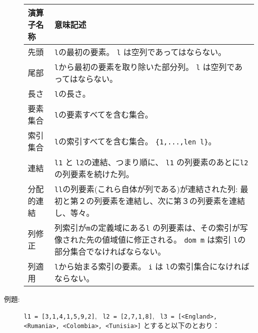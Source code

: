 \documentclass[\pformat,12pt]{jarticle}
\newenvironment{TypeSemantics}{\begin{longtable}[r]{|p{3.5cm}|p{9cm}|}\hline%
  演算子名称 & 意味記述 \\ \hline\hline \endhead}%
  {\hline\end{longtable}}
\begin{document}
\begin{description}
\begin{TypeSemantics}
先頭 & {\tt l}の最初の要素。 {\tt l} は空列であってはならない。 \\ \hline
尾部 &  {\tt l}から最初の要素を取り除いた部分列。 {\tt l} は空列であってはならない。\\ \hline
長さ &  {\tt l}の長さ。 \\ \hline
要素集合 & {\tt l}の要素すべてを含む集合。 \\ \hline
索引集合 &  {\tt l}の索引すべてを含む集合。 \mbox{\tt \{1,...,len l\}}。 \\ \hline
連結 & {\tt l1} と {\tt l2}の連結、つまり順に、 {\tt l1} の列要素のあとに{\tt l2}の列要素を続けた列。 \\ \hline
分配的連結 &  {\tt ll}の列要素(これら自体が列である)が連結された列: 最初と第２の列要素を連結し、次に第３の列要素を連結し、等々。 \\ \hline
列修正 &  列索引が{\tt m}の定義域にある{\tt l} の列要素は、その索引が写像された先の値域値に修正される。 {\tt dom m} は索引 {\tt l}の部分集合でなければならない。 \\ \hline
列適用 &  {\tt l}から始まる索引の要素。 {\tt i} は {\tt l}の索引集合になければならない。 \\ \hline
\end{TypeSemantics}

\item[例題:]  \texttt{l1 = [3,1,4,1,5,9,2]}, \texttt{ l2 = [2,7,1,8]}, \newline
    \texttt{ l3 = [<England>, <Rumania>, <Colombia>,
    <Tunisia>]} とすると以下のとおり： 


\end{description}
\end{document}
